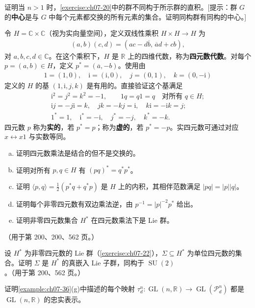\documentclass[../../main.tex]{subfiles}
\begin{document}
\begin{exercise}\label{exercise:ch07-21}
证明当 $n>1$ 时，\cref{exercise:ch07-20}中的群不同构于所示群的直积。[提示：群 $G$ 的\textbf{中心}是与 $G$ 中每个元素都交换的所有元素的集合。证明同构群有同构的中心。]
\end{exercise}

\begin{exercise}\label{exercise:ch07-22}
令 $H=\mathbb{C}\times\mathbb{C}$（视为实向量空间），定义双线性乘积 $H\times H\to H$ 为
\begin{align*}
(a,b)(c,d)=(ac-d\overline{b},\,\overline{a}d+cb),
\end{align*}
对 $a,b,c,d\in\mathbb{C}$。在这个乘积下，$H$ 是 $\mathbb{R}$ 上的四维代数，称为\textbf{四元数代数}。对每个 $p=(a,b)\in H$，定义 $p^*=(\overline{a},-b)$。使用由
\begin{align*}
1=(1,0),\quad \mathrm{i}=(\mathrm{i},0),\quad j=(0,1),\quad k=(0,-\mathrm{i})
\end{align*}
定义的 $H$ 的基 $(1,\mathrm{i},j,k)$ 是有用的。直接验证这个基满足
\begin{align*}
\mathrm{i}^2=j^2=k^2=-1,\qquad 1q=q1=q\quad\text{对所有 }q\in H;\\
\mathrm{i}j=-j\mathrm{i}=k,\quad jk=-kj=\mathrm{i},\quad k\mathrm{i}=-\mathrm{i}k=j;\\
1^*=1,\quad \mathrm{i}^*=-\mathrm{i},\quad j^*=-j,\quad k^*=-k.
\end{align*}
四元数 $p$ 称为\textbf{实的}，若 $p^*=p$；称为\textbf{虚的}，若 $p^*=-p$。实四元数可通过对应 $x\leftrightarrow x1$ 与实数等同。
\begin{enumerate}[(a)]
\item 证明四元数乘法是结合的但不是交换的。
\item 证明对所有 $p,q\in H$ 有 $(pq)^*=q^*p^*$。
\item 证明 $\langle p,q\rangle=\frac{1}{2}(p^*q+q^*p)$ 是 $H$ 上的内积，其相伴范数满足 $|pq|=|p||q|$。
\item 证明每个非零四元数有双边乘法逆，由 $p^{-1}=|p|^{-2}p^*$ 给出。
\item 证明非零四元数集合 $H^*$ 在四元数乘法下是 Lie 群。
\end{enumerate}
（用于第 200、200、562 页。）
\end{exercise}

\begin{exercise}\label{exercise:ch07-23}
设 $H^*$ 为非零四元数的 Lie 群（\cref{exercise:ch07-22}），$\Sigma\subseteq H^*$ 为单位四元数的集合。证明 $\Sigma$ 是 $H^*$ 的真嵌入 Lie 子群，同构于 $\operatorname{SU}(2)$。（用于第 200、562 页。）
\end{exercise}

\begin{exercise}\label{exercise:ch07-24}
证明\cref{example:ch07-36}(g)中描述的每个映射 $\tau_d^n\colon\operatorname{GL}(n,\mathbb{R})\to\operatorname{GL}(\mathcal{P}_d^n)$ 都是 $\operatorname{GL}(n,\mathbb{R})$ 的忠实表示。
\end{exercise}
\end{document}
